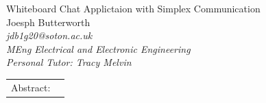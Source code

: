 \documentclass[10pt]{article}
\newcommand{\docTitle}{Whiteboard Chat Applictaion with Simplex Communication}
\newcommand{\docAuthor}{Joesph Butterworth}
\begin{document}

{
    \centering
    \fontsize{28pt}{29.4pt} \selectfont
    \docTitle\\
    \vspace{25pt}
    \fontsize{11pt}{11.55pt}\selectfont
    \docAuthor\\
    \fontsize{10pt}{10.5pt}\selectfont
    \textit{jdb1g20@soton.ac.uk} \\ %
    \textit{MEng Electrical and Electronic Engineering} \\ 
    \textit{Personal Tutor: Tracy Melvin} \\ %
}
\vspace{25pt}

{
\setlength{\tabcolsep}{0cm} %
\centering
\begin{tabular}{p{2cm}p{\textwidth-2cm}}
    Abstract: &
    
\end{tabular}  
}
\vspace{25pt}
\end{document}
